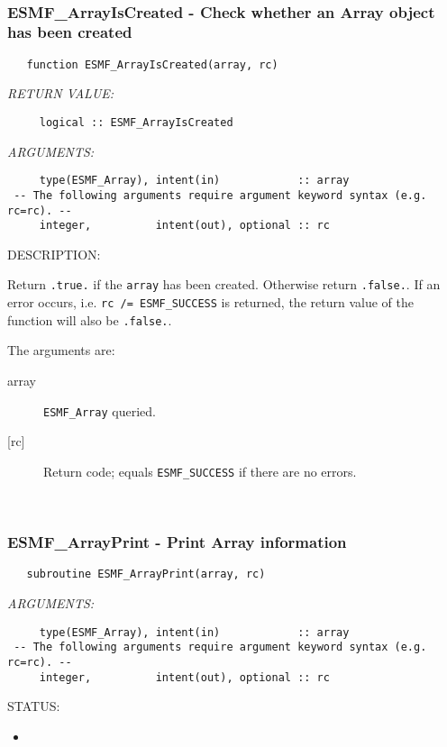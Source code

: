  
\mbox{}\hrulefill\ 
 
\subsubsection [ESMF\_ArrayIsCreated] {ESMF\_ArrayIsCreated - Check whether an Array object has been created}


 
\begin{verbatim}   function ESMF_ArrayIsCreated(array, rc)\end{verbatim}{\em RETURN VALUE:}
\begin{verbatim}     logical :: ESMF_ArrayIsCreated\end{verbatim}{\em ARGUMENTS:}
\begin{verbatim}     type(ESMF_Array), intent(in)            :: array
 -- The following arguments require argument keyword syntax (e.g. rc=rc). --
     integer,          intent(out), optional :: rc
 \end{verbatim}
{\sf DESCRIPTION:\\ }


     Return {\tt .true.} if the {\tt array} has been created. Otherwise return 
     {\tt .false.}. If an error occurs, i.e. {\tt rc /= ESMF\_SUCCESS} is 
     returned, the return value of the function will also be {\tt .false.}.
  
   The arguments are:
     \begin{description}
     \item[array]
       {\tt ESMF\_Array} queried.
     \item[{[rc]}]
       Return code; equals {\tt ESMF\_SUCCESS} if there are no errors.
     \end{description}
   
 
\mbox{}\hrulefill\ 
 
\subsubsection [ESMF\_ArrayPrint] {ESMF\_ArrayPrint - Print Array information}


 
\begin{verbatim}   subroutine ESMF_ArrayPrint(array, rc)\end{verbatim}{\em ARGUMENTS:}
\begin{verbatim}     type(ESMF_Array), intent(in)            :: array
 -- The following arguments require argument keyword syntax (e.g. rc=rc). --
     integer,          intent(out), optional :: rc  \end{verbatim}
{\sf STATUS:}
   \begin{itemize}
   \item{}
   \end{itemize}
  
